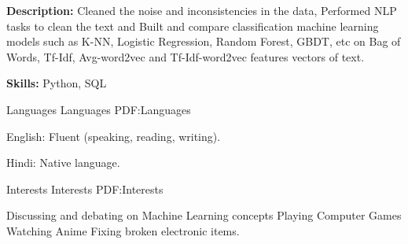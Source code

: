 \documentclass[letterpaper,MMMyyyy,nonstopmode]{simpleresumecv}
\begin{document}
\begin{Body}
            \Gap

            \Item
                \textbf{Description:}
                Cleaned the noise and inconsistencies in the data, 
                Performed NLP tasks to clean the text and 
                Built and compare classification machine learning models 
                such as K-NN, Logistic Regression, Random Forest, GBDT, etc  
                on Bag of Words, Tf-Idf, Avg-word2vec and Tf-Idf-word2vec 
                features vectors of text.
            
            \Gap

            \Item
                \textbf{Skills:}
                Python, SQL
         
        
    
    \Section
    {Languages}
    {Languages}
    {PDF:Languages}
    
        \BulletItem
        English:  Fluent (speaking, reading, writing).
        
        \Gap
        
        \BulletItem
        Hindi: Native language.
    
    
    \Section
    {Interests}
    {Interests}
    {PDF:Interests}
    
        \Entry
        \BulletItem
            Discussing and debating on Machine Learning concepts
        \BulletItem
            Playing Computer Games
        \BulletItem
            Watching Anime
        \BulletItem
            Fixing broken electronic items.
    
    \end{Body}
    
    
\end{document}
